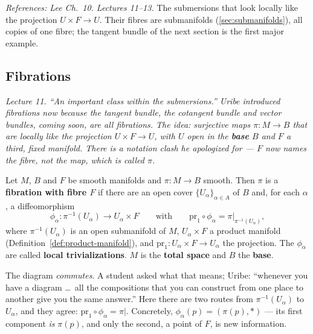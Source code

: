\documentclass[11pt]{report}
\makeatletter
\newcounter{defcounter}[section]
\newcommand{\deflabel}[1]{\edef\@currentlabel{\arabic{section}.\arabic{defcounter}}\label{#1}}
\newcommand{\leeref}[1]{\par\smallskip{\raggedleft\footnotesize\textsc{Lee}:\ #1\par}}
\makeatother
\begin{document}
\textit{References: Lee Ch.~10. Lectures 11--13.} The submersions that look locally like the projection $U \times F \to U$. Their fibres are submanifolds (\ref{sec:submanifolds}), all copies of one fibre; the tangent bundle of the next section is the first major example.

\subsection{Fibrations}\label{sub:fibrations}

\textit{Lecture 11. ``An important class within the submersions.'' Uribe introduced fibrations now because the tangent bundle, the cotangent bundle and vector bundles, coming soon, are all fibrations. The idea: surjective maps $\pi : M \to B$ that are locally like the projection $U \times F \to U$, with $U$ open in the \textbf{base} $B$ and $F$ a third, fixed manifold. There is a notation clash he apologized for --- $F$ now names the fibre, not the map, which is called $\pi$.}

\begin{defbox}[Fibration]\deflabel{def:fibration}
Let $M$, $B$ and $F$ be smooth manifolds and $\pi : M \to B$ smooth. Then $\pi$ is a \textbf{fibration with fibre $F$} if there are an open cover $\{U_\alpha\}_{\alpha \in A}$ of $B$ and, for each $\alpha$, a diffeomorphism
\[
\phi_\alpha : \pi^{-1}(U_\alpha) \longrightarrow U_\alpha \times F \qquad \text{with} \qquad \mathrm{pr}_1 \circ \phi_\alpha = \pi|_{\pi^{-1}(U_\alpha)},
\]
where $\pi^{-1}(U_\alpha)$ is an open submanifold of $M$, $U_\alpha \times F$ a product manifold (Definition~\ref{def:product-manifold}), and $\mathrm{pr}_1 : U_\alpha \times F \to U_\alpha$ the projection. The $\phi_\alpha$ are called \textbf{local trivializations}. $M$ is the \textbf{total space} and $B$ the \textbf{base}.
\leeref{Ch.~10, smooth fiber bundles}
\end{defbox}

\begin{center}
\end{center}

The diagram \emph{commutes}. A student asked what that means; Uribe: ``whenever you have a diagram \ldots\ all the compositions that you can construct from one place to another give you the same answer.'' Here there are two routes from $\pi^{-1}(U_\alpha)$ to $U_\alpha$, and they agree: $\mathrm{pr}_1 \circ \phi_\alpha = \pi|$. Concretely, $\phi_\alpha(p) = (\pi(p), \ast)$ --- its first component \emph{is} $\pi(p)$, and only the second, a point of $F$, is new information.
\end{document}
